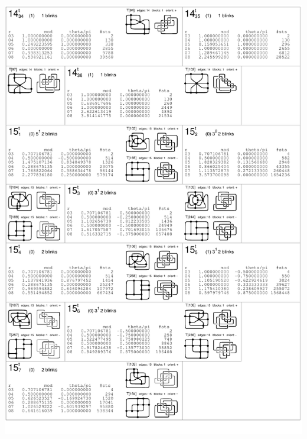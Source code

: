 \begin{center}
 \includegraphics[height=23.5cm]{E.figsbw2/con3catalog007_bw.pdf} \eject

\end{center}
